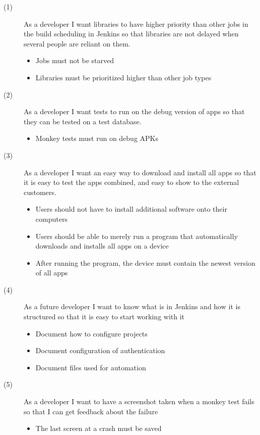 \begin{description}
  \item[(1)] As a developer I want libraries to have higher priority than other jobs in the build scheduling in Jenkins so that libraries are not delayed when several people are reliant on them.
  \begin{itemize}
    \item Jobs must not be starved
    \item Libraries must be prioritized higher than other job types
  \end{itemize}
  \item[(2)] As a developer I want tests to run on the debug version of apps so that they can be tested on a test database.
  \begin{itemize}
    \item Monkey tests must run on debug APKs
  \end{itemize}
  \item[(3)] As a developer I want an easy way to download and install all apps so that it is easy to test the apps combined, and easy to show to the external customers.
  \begin{itemize}
    \item Users should not have to install additional software onto their computers
    \item Users should be able to merely run a program that automatically downloads and installs all apps on a device
    \item After running the program, the device must contain the newest version of all apps 
  \end{itemize}
  \item[(4)] As a future developer I want to know what is in Jenkins and how it is structured so that it is easy to start working with it
  \begin{itemize}
    \item Document how to configure projects
    \item Document configuration of authentication
    \item Document files used for automation
  \end{itemize}
  \item[(5)] As a developer I want to have a screenshot taken when a monkey test fails so that I can get feedback about the failure
  \begin{itemize}
    \item The last screen at a crash must be saved
  \end{itemize}
\end{description}


